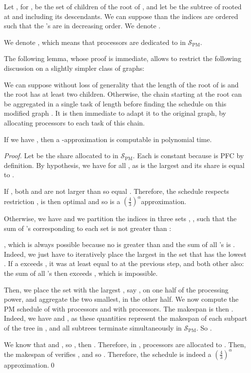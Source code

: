 \documentclass{llncs}
\newcommand{\spm}{\ensuremath{\mathcal{S}_{\mathrm{PM}}}\xspace}
\newcommand{\frtrd}{\ensuremath{\left(\frac{4}{3}\right)^\alpha}}
\begin{document}
Let , for , be the set of children of the root
of , and let  be the subtree of  rooted at  and
including its descendants. We can suppose than the indices are ordered
such that the 's are in decreasing order. We denote
.

We denote , which means that
 processors are dedicated to  in \spm.

The following lemma, whose proof is immediate, allows to restrict the
following discussion on a slightly simpler class of graphs:

\begin{lemma}
\label{lem:chainroot}
We can suppose without loss of generality that the length of the root
of  is  and the root has at least two children. Otherwise, the
chain starting at the root can be aggregated in a single task of
length  before finding the schedule on this modified graph
. It is then immediate to adapt it to the original graph,
by allocating  processors to each task of this chain.
\end{lemma}





\begin{lemma}
\label{lem:x<1}
If we have , then a -approximation is computable in polynomial time.
\end{lemma}


\begin{proof}

Let  be the share allocated to  in \spm. Each  is constant because  is PFC by definition. By hypothesis, we have  for all , as  is the largest  and its share is equal to .

 If , both  and  are not larger than  so equal . Therefore, the schedule  respects restriction , is then optimal and so is a \frtrd approximation. 
 
 Otherwise, we have  and we partition the indices  in three sets , ,  such that the sum  of 's corresponding to each set  is not greater than :

 , which is always possible because no  is greater than  and the sum of all 's is . Indeed, we just have to iteratively place the largest  in the set that has the lowest . If a  exceeds , it was at least equal to  at the previous step, and both other  also: the sum of all 's then exceeds , which is impossible.
 
 Then, we place the set with the largest , say , on one half of the processing power, and aggregate the two smallest,  in the other half. We now compute the PM schedule of  with  processors and  with  processors. The makespan is then .
  Indeed, we have  and , as these quantities represent the makespan of each subpart of the tree in , and all subtrees  terminate simultaneously in \spm.  So .
  
  
 We know that  and , so , then .
Therefore, in ,  processors are allocated to .
Then, the makespan of  verifies , and so . Therefore, the schedule is indeed a \frtrd approximation.\qed
\end{proof} 
\end{document}
